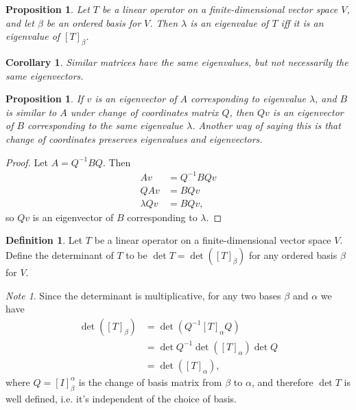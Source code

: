 \documentclass[12pt]{article}
\theoremstyle{plain}
\newtheorem{corollary}[theorem]{Corollary}
\newtheorem{proposition}[theorem]{Proposition}
\theoremstyle{definition}
\newtheorem{definition}[theorem]{Definition}
\theoremstyle{remark}
\newtheorem{note}[theorem]{Note}
\begin{document}
\begin{proposition}
Let $T$ be a linear operator on a finite-dimensional vector space $V$, and let $\beta$ be an ordered basis for $V$. Then $\lambda$ is an eigenvalue of $T$ iff it is an eigenvalue of $[T]_\beta$.
\end{proposition}

\begin{corollary}
Similar matrices have the same eigenvalues, but not necessarily the same eigenvectors.
\end{corollary}

\begin{proposition}
If $v$ is an eigenvector of $A$ corresponding to eigenvalue $\lambda$, and $B$ is similar to $A$ under change of coordinates matrix $Q$, then $Qv$ is an eigenvector of $B$ corresponding to the same eigenvalue $\lambda$.  Another way of saying this is that change of coordinates preserves eigenvalues and eigenvectors.
\end{proposition}

\begin{proof}
Let $A = Q^{-1}BQ$. Then
\begin{align*}
Av &= Q^{-1}BQv \\
QAv &= BQv \\
\lambda Qv &= BQv,
\end{align*}
so $Qv$ is an eigenvector of $B$ corresponding to $\lambda$.
\end{proof}

\begin{definition}\label{determinantofoperator}
Let $T$ be a linear operator on a finite-dimensional vector space $V$. Define the determinant of $T$ to be $\det T = \det([T]_\beta)$ for any ordered basis $\beta$ for $V$.
\end{definition}

\begin{note}
Since the determinant is multiplicative, for any two bases $\beta$ and $\alpha$ we have
\begin{align*}
\det([T]_\beta) &= \det(Q^{-1} [T]_\alpha Q) \\
&= \det Q^{-1} \det([T]_\alpha) \det Q \\
&= \det([T]_\alpha),
\end{align*}
where $Q = [I]^\alpha_\beta$ is the change of basis matrix from $\beta$ to $\alpha$, and therefore $\det T$ is well defined, i.e. it's independent of the choice of basis.
\end{note}
\end{document}
